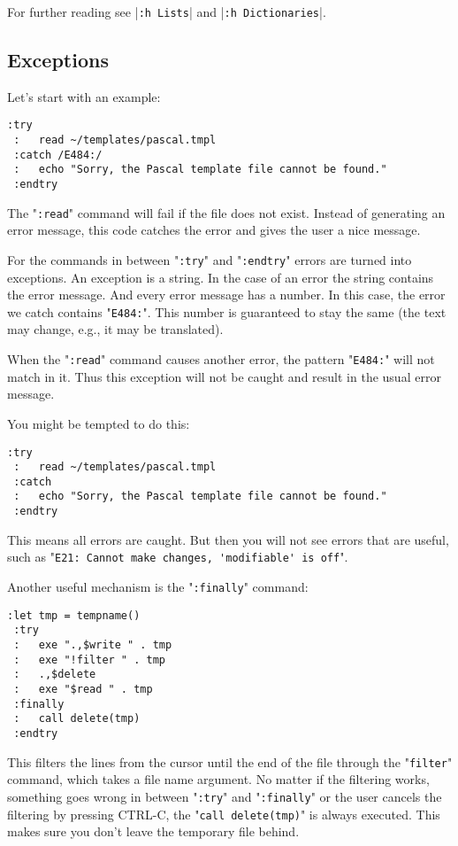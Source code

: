 For further reading see |\verb!:h Lists!| and |\verb!:h Dictionaries!|.
\subsection{Exceptions}
Let's start with an example:

\begin{Verbatim}[samepage=true]
 :try
 :   read ~/templates/pascal.tmpl
 :catch /E484:/
 :   echo "Sorry, the Pascal template file cannot be found."
 :endtry
\end{Verbatim}

The "\verb!:read!" command will fail if the file does not exist.
Instead of generating an error message, this code catches the error and gives the user a nice message.

For the commands in between "\verb!:try!" and "\verb!:endtry!" errors are turned into exceptions.
An exception is a string.
In the case of an error the string contains the error message.
And every error message has a number.
In this case, the error we catch contains "\verb!E484:!".
This number is guaranteed to stay the same (the text may change, e.g., it may be translated).

When the "\verb!:read!" command causes another error, the pattern "\verb!E484:!" will not match in it.
Thus this exception will not be caught and result in the usual error message.

You might be tempted to do this:

\begin{Verbatim}[samepage=true]
 :try
 :   read ~/templates/pascal.tmpl
 :catch
 :   echo "Sorry, the Pascal template file cannot be found."
 :endtry
\end{Verbatim}

This means all errors are caught.
But then you will not see errors that are useful, such as "\verb!E21: Cannot make changes, 'modifiable' is off!".

Another useful mechanism is the "\verb!:finally!" command:

\begin{Verbatim}[samepage=true]
 :let tmp = tempname()
 :try
 :   exe ".,$write " . tmp
 :   exe "!filter " . tmp
 :   .,$delete
 :   exe "$read " . tmp
 :finally
 :   call delete(tmp)
 :endtry
\end{Verbatim}

This filters the lines from the cursor until the end of the file through the "\verb!filter!" command, which takes a file name argument.
No matter if the filtering works, something goes wrong in between "\verb!:try!" and "\verb!:finally!" or the user cancels the filtering by pressing CTRL-C, the "\verb!call delete(tmp)!" is always executed.
This makes sure you don't leave the temporary file behind.

